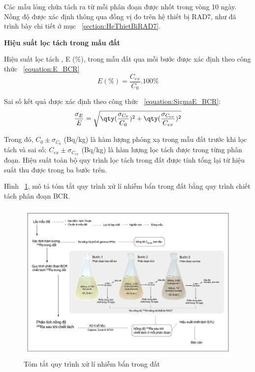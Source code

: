 Các mẫu lỏng chứa  tách ra từ mỗi phân đoạn được nhốt trong vòng 10 ngày. Nồng độ  được xác định thông qua đồng vị  đo trên hệ thiết bị RAD7, như đã trình bày chi tiết ở mục ~\ref{section:HeThietBiRAD7}. 

\textbf{Hiệu suất lọc tách  trong mẫu đất} 

Hiệu suất lọc tách , E (\%), trong mẫu đất qua mỗi bước được xác định theo công thức ~\ref{equation:E_BCR}
\begin{equation}
    E (\%) =  \dfrac{C_{ex}}{C_0}.100\% 
    \label{equation:E_BCR}
\end{equation} 

Sai số kết quả được xác định theo công thức ~\ref{equation:SigmaE_BCR}:
    \begin{equation}
        \dfrac{\sigma_E}{E} = \sqrt{\qty(\dfrac{\sigma_{C_0}}{C_0})^2  + \qty(\dfrac{\sigma_{C_{ex}}}{C_{ex}})^2   } 
        \label{equation:SigmaE_BCR} 
    \end{equation}

    Trong đó, $C_0 \pm \sigma_{C_0}$ (Bq/kg) là hàm lượng phóng xạ trong mẫu đất trước khi lọc tách và sai số; $C_{ex} \pm \sigma_{C_{ex}}$ (Bq/kg) là hàm lượng  lọc tách được trong từng phân đoạn.
    Hiệu suất toàn bộ quy trình lọc tách  trong đất được tính tổng lại từ hiệu suất thu được trong ba bước trên.
    

    
    


   Hình ~\ref{figure:DiagramRadiuminSoilBCR}, mô tả tóm tắt quy trình xử lí nhiễm bẩn  trong đất bằng quy trình chiết tách phân đoạn BCR.

    \begin{figure}[htbp]
        \centering
        \includegraphics[width=1.1\textwidth]{Image/BCR-Figure1.png}
        \caption{Tóm tắt quy trình xử lí nhiễm bẩn  trong đất}
        \label{figure:DiagramRadiuminSoilBCR}
    \end{figure}



